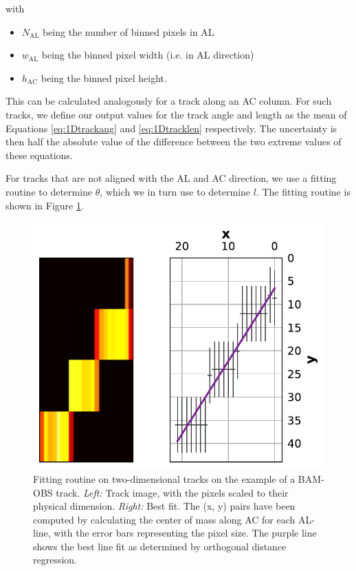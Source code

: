 \documentclass[a4paper, 11pt]{article}
\begin{document}
with
\begin{itemize}
  \item $N_\mathrm{AL}$ being the number of binned pixels in AL
  \item $w_\mathrm{AL}$ being the binned pixel width (i.e. in AL direction)
  \item $h_\mathrm{AC}$ being the binned pixel height.
\end{itemize}

This can be calculated analogously for a track along an AC column. For such tracks, we define our output values for the track angle and length as the mean of Equations \ref{eq:1Dtrackang} and \ref{eq:1Dtracklen} respectively. The uncertainty is then half the absolute value of the difference between the two extreme values of these equations.

For tracks that are not aligned with the AL and AC direction, we use a fitting routine to determine $\theta$, which we in turn use to determine $l$. The fitting routine is shown in Figure \ref{fig:2D_fit}.

\begin{figure}[!h]
  \centering
  \includegraphics{images/postprocessing/2D_fit}
  \caption{Fitting routine on two-dimensional tracks on the example of a BAM-OBS track. \textit{Left:} Track image, with the pixels scaled to their physical dimension. \textit{Right:} Best fit. The (x, y) pairs have been computed by calculating the center of mass along AC for each AL-line, with the error bars representing the pixel size. The purple line shows the best line fit as determined by orthogonal distance regression.}
  \label{fig:2D_fit}
\end{figure}
\end{document}

